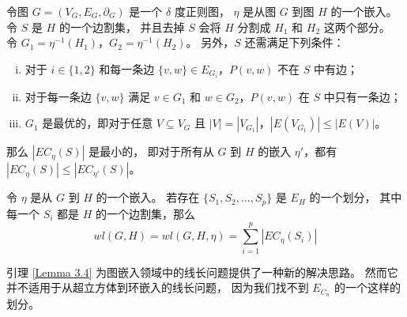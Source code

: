\begin{lemma}[拥塞引理]
\label{Lemma 3.3}
令图 $G = (V_G, E_G, \partial_G)$ 是一个 $\delta$ 度正则图，
$\eta$ 是从图 $G$ 到图 $H$ 的一个嵌入。
令 $S$ 是 $H$ 的一个边割集，
并且去掉 $S$ 会将 $H$ 分割成 $H_1$ 和 $H_2$ 这两个部分。
令 $G_1 = \eta^{-1}(H_1)$，$G_2 = \eta^{-1}(H_2)$。
另外，$S$ 还需满足下列条件：
\begin{enumerate}[(i)]
\item 对于 $i \in \{1, 2\}$ 和每一条边 $\{v, w\} \in E_{G_i}$，$P(v, w)$ 不在 $S$ 中有边；
\item 对于每一条边 $\{v, w\}$ 满足 $v \in G_1$ 和 $w \in G_2$，$P(v, w)$ 在 $S$ 中只有一条边；
\item $G_1$ 是最优的，即对于任意 $V \subseteq V_G$ 且 $|V| = |V_{G_1}|$，$|E(V_{G_1})| \le |E(V)|$。
\end{enumerate}
那么 $|EC_\eta(S)|$ 是最小的，
即对于所有从 $G$ 到 $H$ 的嵌入 $\eta'$，都有 $|EC_\eta(S)| \le |EC_{\eta'}(S)|$。
\end{lemma}

\begin{lemma}[划分引理]
\label{Lemma 3.4}
令 $\eta$ 是从 $G$ 到 $H$ 的一个嵌入。
若存在 $\{S_1, S_2, \dots, S_p\}$ 是 $E_H$ 的一个划分，
其中每一个 $S_i$ 都是 $H$ 的一个边割集，那么
\begin{equation*}
wl(G, H) = wl(G, H, \eta) = \sum_{i = 1}^p |EC_\eta(S_i)|
\end{equation*}
\end{lemma}

引理 \ref{Lemma 3.4} 为图嵌入领域中的线长问题提供了一种新的解决思路。
然而它并不适用于从超立方体到环嵌入的线长问题，
因为我们找不到 $E_{C_n}$ 的一个这样的划分。
